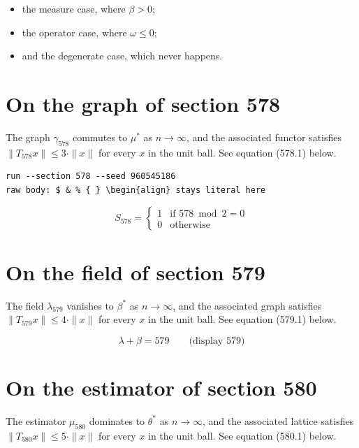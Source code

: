\documentclass{article}
\begin{document}
\begin{itemize}
  \item the measure case, where $\beta > 0$;
  \item the operator case, where $\omega \leq 0$;
  \item and the degenerate case, which never happens.
\end{itemize}

\section{On the graph of section 578}
The graph $\gamma_{578}$ commutes to $\mu^{*}$ as $n \to \infty$,
and the associated functor satisfies $\|T_{578} x\| \leq 3 \cdot \|x\|$
for every $x$ in the unit ball. See equation (578.1) below.

\begin{verbatim}
run --section 578 --seed 960545186
raw body: $ & % { } \begin{align} stays literal here
\end{verbatim}

\begin{equation}
S_{578} = \begin{cases} 1 & \text{if } 578 \bmod 2 = 0 \\ 0 & \text{otherwise} \end{cases}
\end{equation}

\section{On the field of section 579}
The field $\lambda_{579}$ vanishes to $\beta^{*}$ as $n \to \infty$,
and the associated graph satisfies $\|T_{579} x\| \leq 4 \cdot \|x\|$
for every $x$ in the unit ball. See equation (579.1) below.

$$
\lambda + \beta = 579 \qquad \text{(display 579)}
$$

\section{On the estimator of section 580}
The estimator $\mu_{580}$ dominates to $\theta^{*}$ as $n \to \infty$,
and the associated lattice satisfies $\|T_{580} x\| \leq 5 \cdot \|x\|$
for every $x$ in the unit ball. See equation (580.1) below.
\end{document}
